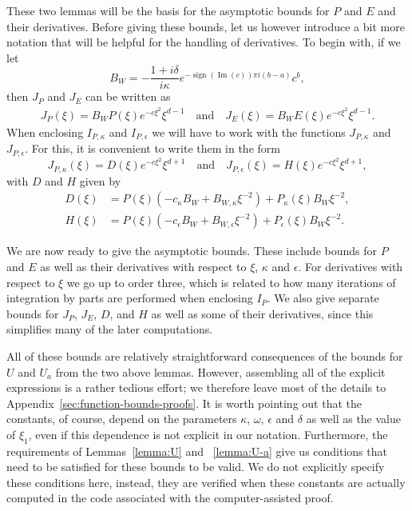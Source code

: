 \documentclass[11pt]{article}
\DeclareMathOperator{\imag}{Im}
\DeclareMathOperator{\sign}{sign}
\begin{document}
These two lemmas will be the basis for the asymptotic bounds for \(P\)
and \(E\) and their derivatives. Before giving these bounds, let us
however introduce a bit more notation that will be helpful for the
handling of derivatives. To begin with, if we let
\begin{equation*}
  B_{W} = -\frac{1 + i\delta}{i\kappa}e^{-\sign(\imag(c))\pi i(b - a)}c^{b},
\end{equation*}
then \(J_{P}\) and \(J_{E}\) can be written as
\begin{align*}
  J_{P}(\xi) = B_{W}P(\xi)e^{-c\xi^{2}}\xi^{d - 1}
  \quad\text{and}\quad
  J_{E}(\xi) = B_{W}E(\xi)e^{-c\xi^{2}}\xi^{d - 1}.
\end{align*}
When enclosing \(I_{P,\kappa}\) and \(I_{P,\epsilon}\) we will have to
work with the functions \(J_{P,\kappa}\) and \(J_{P,\epsilon}\). For
this, it is convenient to write them in the form
\begin{equation*}
  J_{P,\kappa}(\xi) = D(\xi)e^{-c\xi^{2}}\xi^{d + 1}
  \quad\text{and}\quad
  J_{P,\epsilon}(\xi) = H(\xi)e^{-c\xi^{2}}\xi^{d + 1},
\end{equation*}
with \(D\) and \(H\) given by
\begin{align}
  \label{eq:D}
  D(\xi) &= P(\xi)(-c_{\kappa}B_{W} + B_{W,\kappa}\xi^{-2}) + P_{\kappa}(\xi)B_{W}\xi^{-2},\\
  \label{eq:H}
  H(\xi) &= P(\xi)(-c_{\epsilon}B_{W} + B_{W,\epsilon}\xi^{-2}) + P_{\epsilon}(\xi)B_{W}\xi^{-2}.
\end{align}

We are now ready to give the asymptotic bounds. These include bounds
for \(P\) and \(E\) as well as their derivatives with respect to
\(\xi\), \(\kappa\) and \(\epsilon\). For derivatives with respect to
\(\xi\) we go up to order three, which is related to how many
iterations of integration by parts are performed when enclosing
\(I_{P}\). We also give separate bounds for \(J_{P}\), \(J_{E}\),
\(D\), and \(H\) as well as some of their derivatives, since this
simplifies many of the later computations.

All of these bounds are relatively straightforward consequences of the
bounds for \(U\) and \(U_{a}\) from the two above lemmas. However,
assembling all of the explicit expressions is a rather tedious effort;
we therefore leave most of the details to
Appendix~\ref{sec:function-bounds-proofs}. It is worth pointing out
that the constants, of course, depend on the parameters \(\kappa\),
\(\omega\), \(\epsilon\) and \(\delta\) as well as the value of
\(\xi_{1}\), even if this dependence is not explicit in our notation.
Furthermore, the requirements of Lemmas~\ref{lemma:U} and
~\ref{lemma:U-a} give us conditions that need to be satisfied for
these bounds to be valid. We do not explicitly specify these conditions
here, instead, they are verified when these constants are actually
computed in the code associated with the computer-assisted proof.
\end{document}
